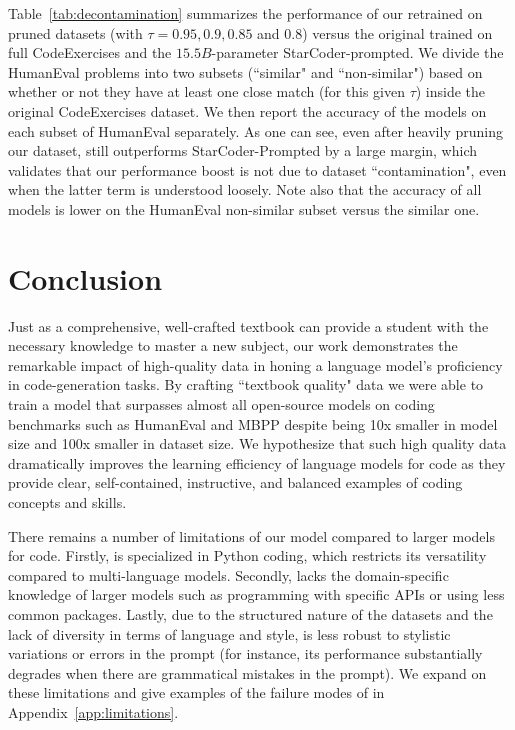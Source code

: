 Table~\ref{tab:decontamination} summarizes the performance of our retrained \phione on pruned datasets (with $\tau = 0.95, 0.9, 0.85$ and $0.8$) versus the original \phione trained on full CodeExercises and the $15.5B$-parameter StarCoder-prompted. We divide the HumanEval problems into two subsets (``similar" and ``non-similar") based on whether or not they have at least one close match (for this given $\tau$) inside the original CodeExercises dataset. We then report the accuracy of the models on each subset of HumanEval separately. As one can see, even after heavily pruning our dataset, \phione still outperforms StarCoder-Prompted by a large margin, which validates that our performance boost is not due to dataset ``contamination", even when the latter term is understood loosely. Note also that the accuracy of all models is lower on the HumanEval non-similar subset versus the similar one.

\section{Conclusion}
Just as a comprehensive, well-crafted textbook can provide a student with the necessary knowledge to master a new subject, our work demonstrates the remarkable impact of high-quality data in honing a language model's proficiency in code-generation tasks. By crafting ``textbook quality" data we were able to train a model that surpasses almost all open-source models on coding benchmarks such as HumanEval and MBPP despite being 10x smaller in model size and 100x smaller in dataset size. We hypothesize that such high quality data dramatically improves the learning efficiency of language models for code as they provide clear, self-contained, instructive, and balanced examples of coding concepts and skills.

There remains a number of limitations of our model compared to larger models for code.  Firstly, \phione is specialized in Python coding, which restricts its versatility compared to multi-language models. Secondly, \phione lacks the domain-specific knowledge of larger models such as programming with specific APIs or using less common packages. Lastly, due to the structured nature of the datasets and the lack of diversity in terms of language and style, \phione is less robust to stylistic variations or errors in the prompt (for instance, its performance substantially degrades when there are grammatical mistakes in the prompt). We expand on these limitations and give examples of the failure modes of \phione in Appendix~\ref{app:limitations}. 

